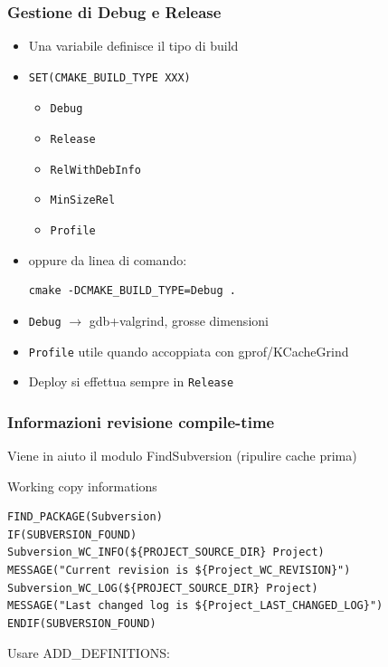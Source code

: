 \documentclass[10pt] {beamer}
\begin{document}
\begin{frame}[fragile]
\frametitle{Gestione di Debug e Release}
\begin{itemize}
\item<1-> Una variabile definisce il tipo di build
\item<2->
\begin{verbatim}
SET(CMAKE_BUILD_TYPE XXX)
\end{verbatim}
    \begin{itemize}
    \item \texttt{Debug}
    \item \texttt{Release}
    \item \texttt{RelWithDebInfo}
    \item \texttt{MinSizeRel}
    \item \texttt{Profile}
    \end{itemize}
\item<3-> oppure da linea di comando:
\begin{verbatim}
cmake -DCMAKE_BUILD_TYPE=Debug .
\end{verbatim}

\item<4-> \texttt{Debug} $\rightarrow$ gdb+valgrind, grosse dimensioni
\item<5-> \texttt{Profile} utile quando accoppiata con gprof/KCacheGrind
\item<6-> Deploy si effettua sempre in \texttt{Release}
\end{itemize}
\end{frame}


\begin{frame}[fragile]
 \frametitle{Informazioni revisione compile-time}
Viene in aiuto il modulo FindSubversion (ripulire cache prima)

\begin{block}{Working copy informations}
\begin{small}
\begin{verbatim}
FIND_PACKAGE(Subversion)
IF(SUBVERSION_FOUND)
Subversion_WC_INFO(${PROJECT_SOURCE_DIR} Project)
MESSAGE("Current revision is ${Project_WC_REVISION}")
Subversion_WC_LOG(${PROJECT_SOURCE_DIR} Project)
MESSAGE("Last changed log is ${Project_LAST_CHANGED_LOG}")
ENDIF(SUBVERSION_FOUND)
\end{verbatim}
\end{small}
\end{block}

Usare ADD\_DEFINITIONS:


\end{frame}
\end{document}
